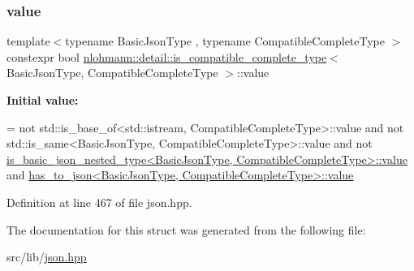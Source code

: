 \subsubsection{\texorpdfstring{value}{value}}
{\footnotesize\ttfamily template$<$typename Basic\+Json\+Type , typename Compatible\+Complete\+Type $>$ \\
constexpr bool \hyperlink{structnlohmann_1_1detail_1_1is__compatible__complete__type}{nlohmann\+::detail\+::is\+\_\+compatible\+\_\+complete\+\_\+type}$<$ Basic\+Json\+Type, Compatible\+Complete\+Type $>$\+::value\hspace{0.3cm}{\ttfamily [static]}}

{\bfseries Initial value\+:}
\begin{DoxyCode}
=
        not std::is\_base\_of<std::istream, CompatibleCompleteType>::value and
        not std::is\_same<BasicJsonType, CompatibleCompleteType>::value and
        not 
      \hyperlink{structnlohmann_1_1detail_1_1is__basic__json__nested__type_aee5fee744e5298a78d557f2ee5f090db}{is\_basic\_json\_nested\_type<BasicJsonType, CompatibleCompleteType>::value}
       and
        \hyperlink{structnlohmann_1_1detail_1_1has__to__json_a18e260c3c6f10328637c4427d3cb3a31}{has\_to\_json<BasicJsonType, CompatibleCompleteType>::value}
\end{DoxyCode}


Definition at line 467 of file json.\+hpp.



The documentation for this struct was generated from the following file\+:\begin{DoxyCompactItemize}
\item 
src/lib/\hyperlink{json_8hpp}{json.\+hpp}\end{DoxyCompactItemize}

